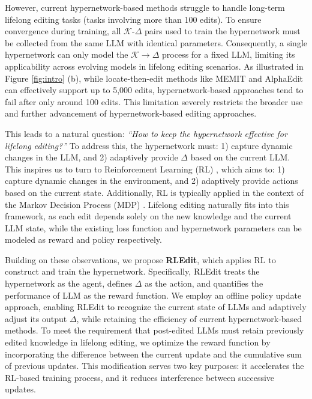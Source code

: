 However, current hypernetwork-based methods struggle to handle long-term lifelong editing tasks (\eg tasks involving more than 100 edits). To ensure convergence during training, all $\mathcal{K}\mbox{-}\Delta$ pairs used to train the hypernetwork must be collected from the same LLM with identical parameters. Consequently, a single hypernetwork can only model the $\mathcal{K} \rightarrow \Delta$ process for a fixed LLM, limiting its applicability across evolving models in lifelong editing scenarios. As illustrated in Figure \ref{fig:intro} (b), while locate-then-edit methods like MEMIT \cite{memit} and AlphaEdit \cite{alphaedit} can effectively support up to 5,000 edits, hypernetwork-based approaches tend to fail after only around 100 edits. This limitation severely restricts the broader use and further advancement of hypernetwork-based editing approaches.

This leads to a natural question: \textit{``How to keep the hypernetwork effective for lifelong editing?''} To address this, the hypernetwork must: 1) capture dynamic changes in the LLM, and 2) adaptively provide $\Delta$ based on the current LLM. This inspires us to turn to Reinforcement Learning (RL) \cite{reinforce_learn}, which aims to: 1) capture dynamic changes in the environment, and 2) adaptively provide actions based on the current state. 
Additionally, RL is typically applied in the context of the Markov Decision Process (MDP) \cite{mdp}. Lifelong editing naturally fits into this framework, as each edit depends solely on the new knowledge and the current LLM state, while the existing loss function and hypernetwork parameters can be modeled as reward and policy respectively. 

Building on these observations, we propose \textbf{RLEdit}, which applies RL to construct and train the hypernetwork. Specifically, RLEdit treats the hypernetwork as the agent, defines $\Delta$ as the action, and quantifies the performance of LLM as the reward function. We employ an offline policy update approach, enabling RLEdit to recognize the current state of LLMs and adaptively adjust its output $\Delta$, while retaining the efficiency of current hypernetwork-based methods. To meet the requirement that post-edited LLMs must retain previously edited knowledge in lifelong editing, we optimize the reward function by incorporating the difference between the current update and the cumulative sum of previous updates. This modification serves two key purposes: it accelerates the RL-based training process, and it reduces interference between successive updates.

